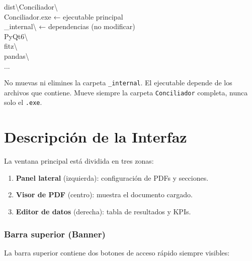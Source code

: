 \documentclass[12pt, a4paper, oneside]{report}
\begin{document}
\begin{rutabox}
dist\textbackslash{}Conciliador\textbackslash{}\\
\hspace{1em}Conciliador.exe          \textcolor{textMuted}{← ejecutable principal}\\
\hspace{1em}\_internal\textbackslash{}             \textcolor{textMuted}{← dependencias (no modificar)}\\
\hspace{2em}PyQt6\textbackslash{}\\
\hspace{2em}fitz\textbackslash{}\\
\hspace{2em}pandas\textbackslash{}\\
\hspace{2em}...
\end{rutabox}

\begin{warningbox}
No muevas ni elimines la carpeta \texttt{\_internal}. El ejecutable depende de
los archivos que contiene. Mueve siempre la carpeta \texttt{Conciliador}
completa, nunca solo el \texttt{.exe}.
\end{warningbox}

\chapter{Descripción de la Interfaz}

La ventana principal está dividida en tres zonas:

\begin{enumerate}
  \item \textbf{Panel lateral} (izquierda): configuración de PDFs y secciones.
  \item \textbf{Visor de PDF} (centro): muestra el documento cargado.
  \item \textbf{Editor de datos} (derecha): tabla de resultados y KPIs.
\end{enumerate}

\subsection{Barra superior (Banner)}

La barra superior contiene dos botones de acceso rápido siempre visibles:
\end{document}
